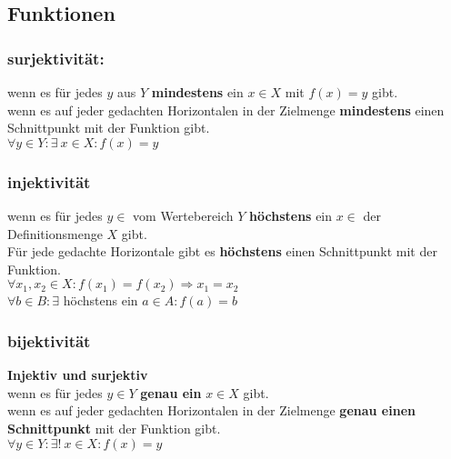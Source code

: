 
\subsection{Funktionen}
\subsubsection{surjektivität:}\label{subs:surjektivitaet}
wenn es für jedes $y$ aus $Y$ \textbf{mindestens} ein $x \in X$ mit $f(x) = y$ gibt.\\
wenn es auf jeder gedachten Horizontalen in der Zielmenge \textbf{mindestens} einen Schnittpunkt mit der Funktion gibt.\\
$\forall y \in Y : \exists \  x \in X:f(x)=y$

\subsubsection{injektivität}\label{subs:injektivitaet}
wenn es für jedes $y \in $ vom Wertebereich $Y$ \textbf{höchstens} ein $x \in$ der Definitionsmenge $X$ gibt.\\
Für jede gedachte Horizontale gibt es \textbf{höchstens} einen Schnittpunkt mit der Funktion.\\
$\forall x_1,x_2 \in X:f(x_1)=f(x_2) \Rightarrow x_1=x_2$\\
$\forall b \in B: \exists$ höchstens ein $a \in A :f(a)=b$\\

\subsubsection{bijektivität}\label{subs:bijektivitaet}  
\textbf{Injektiv und surjektiv}\\
wenn es für jedes $y\in Y$  \textbf{genau ein} $x \in X$ gibt.\\
wenn es auf jeder gedachten Horizontalen in der Zielmenge \textbf{genau einen Schnittpunkt} mit der Funktion gibt.\\
$\forall y \in Y : \exists ! \  x \in X:f(x)=y$